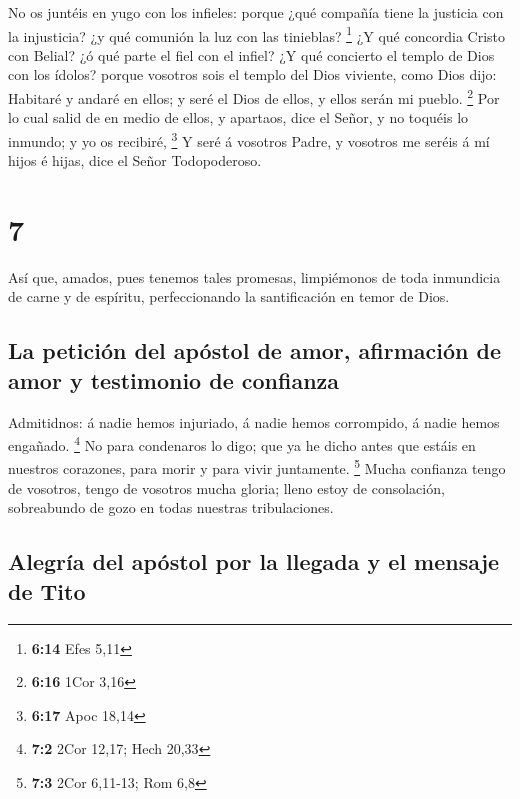 No os juntéis en yugo con los infieles: porque ¿qué
compañía tiene la justicia con la injusticia? ¿y qué comunión la luz con
las tinieblas? \footnote{\textbf{6:14} Efes 5,11}  ¿Y qué
concordia Cristo con Belial? ¿ó qué parte el fiel con el infiel?
 ¿Y qué concierto el templo de Dios con los ídolos?
porque vosotros sois el templo del Dios viviente, como Dios dijo:
Habitaré y andaré en ellos; y seré el Dios de ellos, y ellos serán mi
pueblo. \footnote{\textbf{6:16} 1Cor 3,16}  Por lo cual
salid de en medio de ellos, y apartaos, dice el Señor, y no toquéis lo
inmundo; y yo os recibiré, \footnote{\textbf{6:17} Apoc 18,14}
 Y seré á vosotros Padre, y vosotros me seréis á mí hijos
é hijas, dice el Señor Todopoderoso.

\hypertarget{section-6}{%
\section{7}\label{section-6}}

 Así que, amados, pues tenemos tales promesas, limpiémonos
de toda inmundicia de carne y de espíritu, perfeccionando la
santificación en temor de Dios.

\hypertarget{la-peticiuxf3n-del-apuxf3stol-de-amor-afirmaciuxf3n-de-amor-y-testimonio-de-confianza}{%
\subsection{La petición del apóstol de amor, afirmación de amor y
testimonio de
confianza}\label{la-peticiuxf3n-del-apuxf3stol-de-amor-afirmaciuxf3n-de-amor-y-testimonio-de-confianza}}

 Admitidnos: á nadie hemos injuriado, á nadie hemos
corrompido, á nadie hemos engañado. \footnote{\textbf{7:2} 2Cor 12,17;
  Hech 20,33}  No para condenaros lo digo; que ya he dicho
antes que estáis en nuestros corazones, para morir y para vivir
juntamente. \footnote{\textbf{7:3} 2Cor 6,11-13; Rom 6,8} 
Mucha confianza tengo de vosotros, tengo de vosotros mucha gloria; lleno
estoy de consolación, sobreabundo de gozo en todas nuestras
tribulaciones.

\hypertarget{alegruxeda-del-apuxf3stol-por-la-llegada-y-el-mensaje-de-tito}{%
\subsection{Alegría del apóstol por la llegada y el mensaje de
Tito}\label{alegruxeda-del-apuxf3stol-por-la-llegada-y-el-mensaje-de-tito}}

